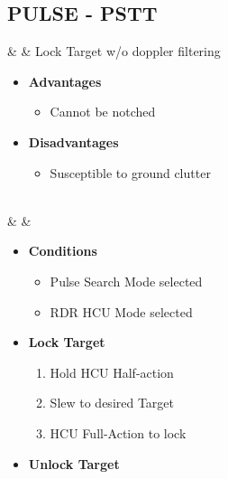\documentclass[fontInter]{TechCheck}
\begin{document}
	\clearpage

	\subsection{PULSE - PSTT}
	\begin{center}
	\end{center}
	\begin{listlongtable}
		\textbf{\textbullet} &  &  Lock Target w/o doppler filtering \thumbnar

		\begin{minipage}[t]{\linewidth}
			\vspace{-7pt}
			\begin{itemize}
				\item \textbf{Advantages}
				\begin{itemize}
					\item Cannot be notched
				\end{itemize}
				\item \textbf{Disadvantages}
				\begin{itemize}
					\item Susceptible to ground clutter
				\end{itemize}
			\end{itemize}
		\end{minipage} \\
		\midrule
		\textbf{\textbullet} &  &
		\begin{minipage}[t]{\linewidth}
			\vspace{-7pt}
			\begin{itemize}
				\item \textbf{Conditions}
				\begin{itemize}
					\item Pulse Search Mode selected
					\item RDR HCU Mode selected
				\end{itemize}
				\item \textbf{Lock Target}
				\begin{enumerate}
					\item Hold HCU Half-action
					\item Slew to desired Target
					\item HCU Full-Action to lock
				\end{enumerate}
				\item \textbf{Unlock Target}
				\begin{enumerate}[label=(\alph*), resume]

\end{enumerate}
\end{itemize}
\end{minipage}
\end{listlongtable}
\end{document}
